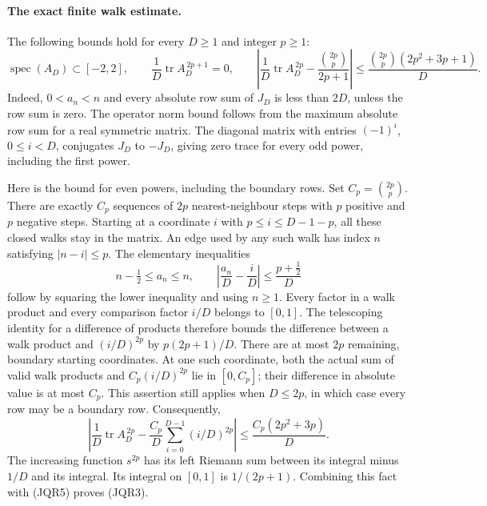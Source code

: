 \paragraph{The exact finite walk estimate.}
The following bounds hold for every \(D\geq1\) and integer \(p\geq1\):
\[
 \operatorname{spec}(A_D)\subset[-2,2],\qquad
 \frac1D\operatorname{tr}A_D^{\,2p+1}=0,\qquad
 \left|\frac1D\operatorname{tr}A_D^{\,2p}
       -\frac{\binom{2p}{p}}{2p+1}\right|
 \leq \frac{\binom{2p}{p}(2p^2+3p+1)}D .
 \tag{JQR3}
\]
Indeed, \(0<a_n<n\) and every absolute row sum of \(J_D\) is less than
\(2D\), unless the row sum is zero.  The operator norm bound follows
from the maximum absolute row sum for a real symmetric matrix.  The
diagonal matrix with entries \((-1)^i\), \(0\leq i<D\), conjugates
\(J_D\) to \(-J_D\), giving zero trace for every odd power, including
the first power.

Here is the bound for even powers, including the boundary rows.  Set
\(C_p=\binom{2p}{p}\).  There are exactly \(C_p\) sequences of \(2p\)
nearest-neighbour steps with \(p\) positive and \(p\) negative steps.
Starting at a coordinate \(i\) with \(p\leq i\leq D-1-p\), all these
closed walks stay in the matrix.  An edge used by any such walk has
index \(n\) satisfying \(|n-i|\leq p\).  The elementary inequalities
\[
 n-\tfrac12\leq a_n\leq n,\qquad
 \left|\frac{a_n}{D}-\frac{i}{D}\right|
 \leq\frac{p+\tfrac12}{D}
 \tag{JQR4}
\]
follow by squaring the lower inequality and using \(n\geq1\).
Every factor in a walk product and every comparison factor \(i/D\)
belongs to \([0,1]\).  The telescoping identity for a difference of
products therefore bounds the difference between a walk product and
\((i/D)^{2p}\) by \(p(2p+1)/D\).
There are at most \(2p\) remaining, boundary starting coordinates.
At one such coordinate, both the actual sum of valid walk products
and \(C_p(i/D)^{2p}\) lie in \([0,C_p]\); their difference in absolute
value is at most \(C_p\).  This assertion still applies when
\(D\leq2p\), in which case every row may be a boundary row.  Consequently,
\[
 \left|\frac1D\operatorname{tr}A_D^{\,2p}
       -\frac{C_p}{D}\sum_{i=0}^{D-1}(i/D)^{2p}\right|
 \leq\frac{C_p(2p^2+3p)}D.
 \tag{JQR5}
\]
The increasing function \(s^{2p}\) has its left Riemann sum between
its integral minus \(1/D\) and its integral.  Its integral on
\([0,1]\) is \(1/(2p+1)\).  Combining this fact with (JQR5) proves
(JQR3).


